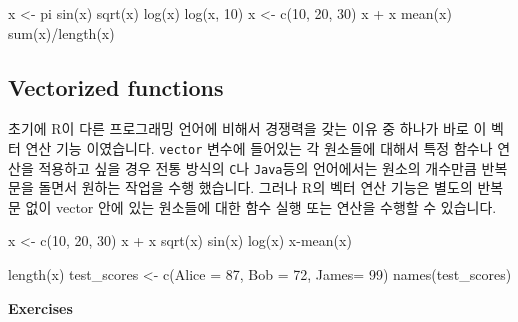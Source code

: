 \documentclass[
  a4paper,
]{book}
\newenvironment{Shaded}{\begin{snugshade}}{\end{snugshade}}
\newcommand{\AttributeTok}[1]{\textcolor[rgb]{0.40,0.45,0.13}{#1}}
\newcommand{\DecValTok}[1]{\textcolor[rgb]{0.68,0.00,0.00}{#1}}
\newcommand{\FunctionTok}[1]{\textcolor[rgb]{0.28,0.35,0.67}{#1}}
\newcommand{\NormalTok}[1]{\textcolor[rgb]{0.00,0.23,0.31}{#1}}
\newcommand{\OtherTok}[1]{\textcolor[rgb]{0.00,0.23,0.31}{#1}}
\newcommand{\SpecialCharTok}[1]{\textcolor[rgb]{0.37,0.37,0.37}{#1}}
\begin{document}
\begin{Shaded}
\begin{Highlighting}[]
\NormalTok{x }\OtherTok{\textless{}{-}}\NormalTok{ pi}
\FunctionTok{sin}\NormalTok{(x)}
\FunctionTok{sqrt}\NormalTok{(x)}
\FunctionTok{log}\NormalTok{(x)}
\FunctionTok{log}\NormalTok{(x, }\DecValTok{10}\NormalTok{)}
\NormalTok{x }\OtherTok{\textless{}{-}} \FunctionTok{c}\NormalTok{(}\DecValTok{10}\NormalTok{, }\DecValTok{20}\NormalTok{, }\DecValTok{30}\NormalTok{)}
\NormalTok{x }\SpecialCharTok{+}\NormalTok{ x}
\FunctionTok{mean}\NormalTok{(x)}
\FunctionTok{sum}\NormalTok{(x)}\SpecialCharTok{/}\FunctionTok{length}\NormalTok{(x)}
\end{Highlighting}
\end{Shaded}

\hypertarget{vectorized-functions}{%
\subsection{Vectorized functions}\label{vectorized-functions}}

초기에 R이 다른 프로그래밍 언어에 비해서 경쟁력을 갖는 이유 중 하나가
바로 이 벡터 연산 기능 이였습니다. \texttt{vector} 변수에 들어있는 각
원소들에 대해서 특정 함수나 연산을 적용하고 싶을 경우 전통 방식의
\texttt{C}나 \texttt{Java}등의 언어에서는 원소의 개수만큼 반복문을
돌면서 원하는 작업을 수행 했습니다. 그러나 R의 벡터 연산 기능은 별도의
반복문 없이 vector 안에 있는 원소들에 대한 함수 실행 또는 연산을 수행할
수 있습니다.

\begin{Shaded}
\begin{Highlighting}[]
\NormalTok{x }\OtherTok{\textless{}{-}} \FunctionTok{c}\NormalTok{(}\DecValTok{10}\NormalTok{, }\DecValTok{20}\NormalTok{, }\DecValTok{30}\NormalTok{)}
\NormalTok{x }\SpecialCharTok{+}\NormalTok{ x}
\FunctionTok{sqrt}\NormalTok{(x)}
\FunctionTok{sin}\NormalTok{(x)}
\FunctionTok{log}\NormalTok{(x)}
\NormalTok{x}\SpecialCharTok{{-}}\FunctionTok{mean}\NormalTok{(x)}

\FunctionTok{length}\NormalTok{(x)}
\NormalTok{test\_scores }\OtherTok{\textless{}{-}} \FunctionTok{c}\NormalTok{(}\AttributeTok{Alice =} \DecValTok{87}\NormalTok{, }\AttributeTok{Bob =} \DecValTok{72}\NormalTok{, }\AttributeTok{James=} \DecValTok{99}\NormalTok{)}
\FunctionTok{names}\NormalTok{(test\_scores)}
\end{Highlighting}
\end{Shaded}

\textbf{Exercises}
\end{document}

